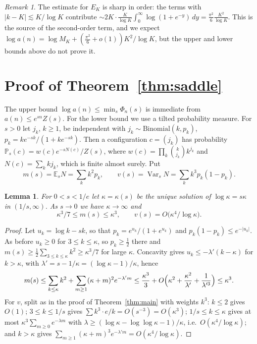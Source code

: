 \documentclass[11pt,a4paper]{article}
\newtheorem{lemma}[theorem]{Lemma}
\theoremstyle{remark}
\newtheorem{remark}[theorem]{Remark}
\begin{document}
\begin{remark}
The estimate for $E_K$ is sharp in order: the terms with $|k-K|\lesssim K/\log K$ contribute $\sim 2K\cdot\frac{K}{\log K}\int_0^\infty\log(1+e^{-y})\,dy=\frac{\pi^2}{6}\frac{K^2}{\log K}$. This is the source of the second-order term, and we expect $\log a(n)=\log M_K+(\frac{\pi^2}{6}+o(1))K^2/\log K$, but the upper and lower bounds above do not prove it.
\end{remark}

\section{Proof of Theorem~\ref{thm:saddle}}

The upper bound $\log a(n)\le\min_s\Phi_n(s)$ is immediate from $a(n)\le e^{sn}Z(s)$. For the lower bound we use a tilted probability measure. For $s>0$ let $j_k$, $k\ge1$, be independent with $j_k\sim\mathrm{Binomial}(k,p_k)$, $p_k=ke^{-sk}/(1+ke^{-sk})$. Then a configuration $c=(j_k)$ has probability $\mathbb P_s(c)=w(c)e^{-sN(c)}/Z(s)$, where $w(c)=\prod_k\binom k{j_k}k^{j_k}$ and $N(c)=\sum_kkj_k$, which is finite almost surely. Put
\[
 m(s)=\mathbb E_sN=\sum_kk^2p_k,\qquad v(s)=\operatorname{Var}_sN=\sum_kk^3p_k(1-p_k).
\]

\begin{lemma}\label{lem:scales}
For $0<s<1/e$ let $\kappa=\kappa(s)$ be the unique solution of $\log\kappa=s\kappa$ in $(1/s,\infty)$. As $s\to0$ we have $\kappa\to\infty$ and
\[
 \kappa^3/7\le m(s)\le\kappa^3,\qquad v(s)=O\bigl(\kappa^4/\log\kappa\bigr).
\]
\end{lemma}

\begin{proof}
Let $u_k=\log k-sk$, so that $p_k=e^{u_k}/(1+e^{u_k})$ and $p_k(1-p_k)\le e^{-|u_k|}$. As before $u_k\ge0$ for $3\le k\le\kappa$, so $p_k\ge\frac12$ there and $m(s)\ge\frac12\sum_{3\le k\le\kappa}k^2\ge\kappa^3/7$ for large $\kappa$. Concavity gives $u_k\le-\lambda'(k-\kappa)$ for $k>\kappa$, with $\lambda'=s-1/\kappa=(\log\kappa-1)/\kappa$, hence
\[
 m(s)\le\sum_{k\le\kappa}k^2+\sum_{m\ge1}(\kappa+m)^2e^{-\lambda'm}\le\frac{\kappa^3}3+O\Bigl(\kappa^2+\frac{\kappa^2}{\lambda'}+\frac1{\lambda'^3}\Bigr)\le\kappa^3 .
\]
For $v$, split as in the proof of Theorem~\ref{thm:main} with weights $k^3$: $k\le2$ gives $O(1)$; $3\le k\le1/s$ gives $\sum k^3\cdot e/k=O(s^{-3})=O(\kappa^3)$; $1/s\le k\le\kappa$ gives at most $\kappa^3\sum_{m\ge0}e^{-\lambda m}$ with $\lambda\ge(\log\kappa-\log\log\kappa-1)/\kappa$, i.e.\ $O(\kappa^4/\log\kappa)$; and $k>\kappa$ gives $\sum_{m\ge1}(\kappa+m)^3e^{-\lambda'm}=O(\kappa^4/\log\kappa)$.
\end{proof}
\end{document}
